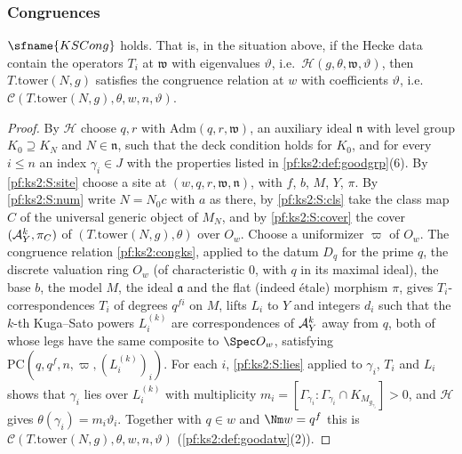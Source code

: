 \subsubsection{Congruences}

\begin{theorem}\label{pf:ks2:kscong}
$\sfname{KSCong}$ holds. That is, in the situation above, if the Hecke data contain the operators
$T_i$ at $\mathfrak w$ with eigenvalues $\vartheta$, i.e.\ $\mathcal{H}(g,\theta,\mathfrak w,\vartheta)$,
then $T.\mathrm{tower}(N,g)$ satisfies the congruence relation at $w$ with coefficients $\vartheta$,
i.e.\ $\mathcal{C}(T.\mathrm{tower}(N,g),\theta,w,n,\vartheta)$.
\end{theorem}

\begin{proof}
By $\mathcal{H}$ choose $q,r$ with $\mathrm{Adm}(q,r,\mathfrak w)$, an auxiliary ideal
$\mathfrak n$ with level group $K_0\supseteq K_N$ and $N\in\mathfrak n$, such that the deck condition
holds for $K_0$, and for every $i\le n$ an index $\gamma_i\in J$ with the properties listed in
\cref{pf:ks2:def:goodgrp}(6). By \ref{pf:ks2:S:site} choose a site at $(w,q,r,\mathfrak w,\mathfrak n)$,
with $f$, $b$, $M$, $Y$, $\pi$. By \ref{pf:ks2:S:num} write $N=N_0c$ with $a$ as there, by
\ref{pf:ks2:S:cls} take the class map $C$ of the universal generic object of $M_N$, and by
\ref{pf:ks2:S:cover} the cover $(\mathcal{A}_Y^k,\pi_C)$ of $(T.\mathrm{tower}(N,g),\theta)$ over $O_w$.
Choose a uniformizer $\varpi$ of $O_w$. The congruence relation \cref{pf:ks2:congks}, applied to the
datum $D_q$ for the prime $q$, the discrete valuation ring $O_w$ (of characteristic $0$, with $q$ in
its maximal ideal), the base $b$, the model $M$, the ideal $\mathfrak a$ and the flat (indeed
\'etale) morphism $\pi$, gives $T_i$-correspondences $T_i$ of degrees $q^{fi}$ on $M$, lifts $L_i$
to $Y$ and integers $d_i$ such that the $k$-th Kuga--Sato powers $L_i^{(k)}$ are correspondences of
$\mathcal{A}_Y^k$ away from $q$, both of whose legs have the same composite to $\Spec O_w$, satisfying
$\mathrm{PC}(q,q^f,n,\varpi,(L_i^{(k)})_i)$. For each $i$, \ref{pf:ks2:S:lies} applied to $\gamma_i$,
$T_i$ and $L_i$ shows that $\gamma_i$ lies over $L_i^{(k)}$ with multiplicity
$m_i=[\Gamma_{\gamma_i}:\Gamma_{\gamma_i}\cap K_{M_{g_{\gamma_i}}}]>0$, and $\mathcal{H}$ gives
$\theta(\gamma_i)=m_i\vartheta_i$. Together with $q\in w$ and $\Nm w=q^f$ this is
$\mathcal{C}(T.\mathrm{tower}(N,g),\theta,w,n,\vartheta)$
(\cref{pf:ks2:def:goodatw}(2)).
\end{proof}

